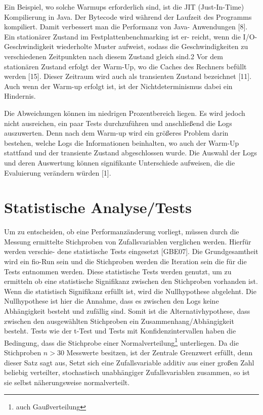  Ein Beispiel, wo solche Warmups erforderlich sind, ist die JIT
(Just-In-Time) Kompilierung in Java. Der Bytecode wird während der Laufzeit
des Programms kompiliert. Damit verbessert man die Performanz von Java-
Anwendungen [8]. Ein stationärer Zustand im Festplattenbenchmarking ist er-
reicht, wenn die I/O-Geschwindigkeit wiederholte Muster aufweist, sodass die
Geschwindigkeiten zu verschiedenen Zeitpunkten nach diesem Zustand gleich
sind.2 Vor dem stationären Zustand erfolgt der Warm-Up, wo die Caches des
Rechners befüllt werden [15]. Dieser Zeitraum wird auch als transienten Zustand
bezeichnet [11]. Auch wenn der Warm-up erfolgt ist, ist der Nichtdeterminismus
dabei ein Hindernis.

Die Abweichungen können im niedrigen Prozentbereich liegen. Es wird jedoch nicht
ausreichen, ein paar Tests durchzuführen und anschließend die Logs auszuwerten. 
Denn nach dem Warm-up wird ein größeres Problem darin bestehen,
welche Logs die Informationen beinhalten, wo auch der Warm-Up stattfand und
der transiente Zustand abgeschlossen wurde. Die Auswahl der Logs und deren
Auswertung können signifikante Unterschiede aufweisen, die die Evaluierung
verändern würden [1].



\section{Statistische Analyse/Tests}
Um zu entscheiden, ob eine Performanzänderung vorliegt, müssen durch die Messung
ermittelte Stichproben von Zufallsvariablen verglichen werden. Hierfür werden verschie-
dene statistische Tests eingesetzt [GBE07]. 
Die Grundgesamtheit wird ein fio-Run sein und die Stichproben werden die Iteration sein die für die Tests entnommen werden.
Diese statistische Tests werden genutzt, um zu ermitteln ob eine statistische Signifikanz zwischen den Stichproben vorhanden ist.
Wenn die statistisch Signifikanz erfüllt ist, wird die Nullhypothese abgelehnt.
Die Nullhypothese ist hier die Annahme, dass es zwischen den Logs keine Abhängigkeit besteht und zufällig sind.
Somit ist die Alternativhypothese, dass zwischen den ausgewählten Stichproben ein Zusammenhang/Abhängigkeit besteht.
Tests wie der t-Test und Tests mit Konfidenzintervallen haben die Bedingung, dass die Stichprobe einer Normalverteilung\footnote{auch Gaußverteilung} unterliegen.
Da die Stichproben $n > 30$ Messwerte besitzen, ist der Zentrale Grenzwert erfüllt, denn dieser Satz sagt aus, 
Setzt sich eine Zufallsvariable additiv aus einer großen Zahl beliebig verteilter, stochastisch unabhängiger
Zufallsvariablen zusammen, so ist sie selbst näherungsweise normalverteilt.

